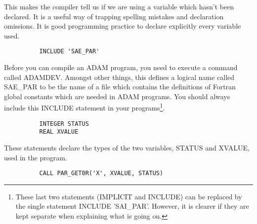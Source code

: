 This makes the compiler tell us if we are using a variable which hasn't been
declared.
It is a useful way of trapping spelling mistakes and declaration omissions.
It is good programming practice to declare explicitly every variable used.

\begin{small}
\begin{verbatim}
          INCLUDE 'SAE_PAR'
\end{verbatim}
\end{small}

Before you can compile an ADAM program, you need to execute a command called
ADAMDEV.
Amongst other things, this defines a logical name called SAE\_PAR to be the name
of a file which contains the definitions of Fortran global constants which are
needed in ADAM programs.
You should always include this INCLUDE statement in your
programs\footnote{These last two statements (IMPLICIT and INCLUDE) can be
replaced by the single statement INCLUDE 'SAI\_PAR'.
However, it is clearer if they are kept separate when explaining what is going
on.}.

\begin{small}
\begin{verbatim}
          INTEGER STATUS
          REAL XVALUE
\end{verbatim}
\end{small}

These statements declare the types of the two variables, STATUS and XVALUE,
used in the program.

\begin{small}
\begin{verbatim}
          CALL PAR_GET0R('X', XVALUE, STATUS)
\end{verbatim}
\end{small}

